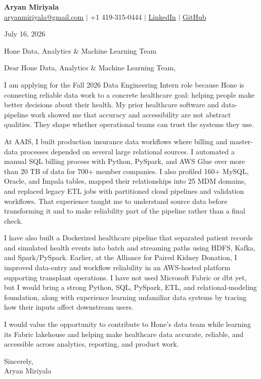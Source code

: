\documentclass[letterpaper,11pt]{article}
\begin{document}
{\Large\textbf{Aryan Miriyala}}\\
\href{mailto:aryanmiriyala@gmail.com}{aryanmiriyala@gmail.com} $|$ +1 419-315-0444 $|$
\href{https://www.linkedin.com/in/aryan-miriyala-7788a21b6/}{LinkedIn} $|$
\href{https://github.com/aryanmiriyala}{GitHub}

July 16, 2026

Hone Data, Analytics \& Machine Learning Team

Dear Hone Data, Analytics \& Machine Learning Team,

I am applying for the Fall 2026 Data Engineering Intern role because Hone is connecting reliable data work to a concrete healthcare goal: helping people make better decisions about their health. My prior healthcare software and data-pipeline work showed me that accuracy and accessibility are not abstract qualities. They shape whether operational teams can trust the systems they use.

At AAIS, I built production insurance data workflows where billing and master-data processes depended on several large relational sources. I automated a manual SQL billing process with Python, PySpark, and AWS Glue over more than 20 TB of data for 700+ member companies. I also profiled 160+ MySQL, Oracle, and Impala tables, mapped their relationships into 25 MDM domains, and replaced legacy ETL jobs with partitioned cloud pipelines and validation workflows. That experience taught me to understand source data before transforming it and to make reliability part of the pipeline rather than a final check.

I have also built a Dockerized healthcare pipeline that separated patient records and simulated health events into batch and streaming paths using HDFS, Kafka, and Spark/PySpark. Earlier, at the Alliance for Paired Kidney Donation, I improved data-entry and workflow reliability in an AWS-hosted platform supporting transplant operations. I have not used Microsoft Fabric or dbt yet, but I would bring a strong Python, SQL, PySpark, ETL, and relational-modeling foundation, along with experience learning unfamiliar data systems by tracing how their inputs affect downstream users.

I would value the opportunity to contribute to Hone's data team while learning its Fabric lakehouse and helping make healthcare data accurate, reliable, and accessible across analytics, reporting, and product work.

Sincerely,\\
Aryan Miriyala
\end{document}
